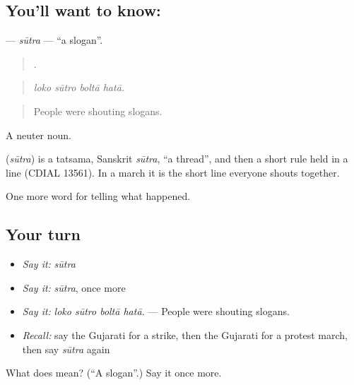 \subsection*{You'll want to know: }
\textbf{} — \emph{sūtra} — \textquotedblleft{}a slogan\textquotedblright{}.

\begin{quote}
   .
\end{quote}

\begin{quote}
\emph{loko sūtro boltā hatā.}
\end{quote}

\begin{quote}
People were shouting slogans.
\end{quote}

A neuter noun.

\begin{cousinweb}
\textbf{} (\emph{sūtra}) is a tatsama, Sanskrit \emph{sūtra}, \textquotedblleft{}a thread\textquotedblright{}, and then a short rule held in a line (CDIAL 13561). In a march it is the short line everyone shouts together.
\end{cousinweb}

\begin{grammarlens}[title={What you've built}]
One more word for telling what happened.
\end{grammarlens}

\subsection*{Your turn}
\begin{itemize}
\raggedright
  \item \emph{Say it:} \emph{sūtra}
  \item \emph{Say it:} \emph{sūtra}, once more
  \item \emph{Say it:} \emph{loko sūtro boltā hatā.} — People were shouting slogans.
  \item \emph{Recall:} say the Gujarati for a strike, then the Gujarati for a protest march, then say \emph{sūtra} again
\end{itemize}

\begin{tcolorbox}[breakable,colback=teal!4,colframe=teal!35!black,title={Before you move on}]
What does  mean? (\textquotedblleft{}A slogan\textquotedblright{}.) Say it once more.
\end{tcolorbox}
